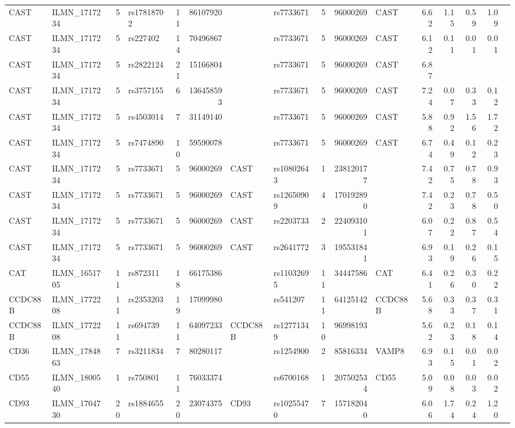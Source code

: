 \documentclass{article}
\begin{document}
\begin{landscape}
{\begin{ThreePartTable}
\begin{longtable}{|llr|lrrl|lrrl|rrrr|r|}
CAST & ILMN\_1717234 & 5 & rs17818702 & 11 & 86107920 &  & rs7733671 & 5 & 96000269 & CAST & 6.62 & 1.15 & 0.59 & 1.09 &  \\
CAST & ILMN\_1717234 & 5 & rs227402 & 14 & 70496867 &  & rs7733671 & 5 & 96000269 & CAST & 6.12 & 0.11 & 0.01 & 0.01 &  \\
CAST & ILMN\_1717234 & 5 & rs2822124 & 21 & 15166804 &  & rs7733671 & 5 & 96000269 & CAST & 6.87 &  &  &  &  \\
CAST & ILMN\_1717234 & 5 & rs3757155 & 6 & 136458593 &  & rs7733671 & 5 & 96000269 & CAST & 7.24 & 0.07 & 0.33 & 0.12 &  \\
CAST & ILMN\_1717234 & 5 & rs4503014 & 7 & 31149140 &  & rs7733671 & 5 & 96000269 & CAST & 5.88 & 0.92 & 1.56 & 1.72 &  \\
CAST & ILMN\_1717234 & 5 & rs7474890 & 10 & 59590078 &  & rs7733671 & 5 & 96000269 & CAST & 6.74 & 0.49 & 0.12 & 0.23 &  \\
CAST & ILMN\_1717234 & 5 & rs7733671 & 5 & 96000269 & CAST & rs10802643 & 1 & 238120177 &  & 7.42 & 0.75 & 0.78 & 0.93 &  \\
CAST & ILMN\_1717234 & 5 & rs7733671 & 5 & 96000269 & CAST & rs12650909 & 4 & 170192890 &  & 7.42 & 0.23 & 0.78 & 0.50 &  \\
CAST & ILMN\_1717234 & 5 & rs7733671 & 5 & 96000269 & CAST & rs2203733 & 2 & 224093101 &  & 6.07 & 0.22 & 0.87 & 0.54 &  \\
CAST & ILMN\_1717234 & 5 & rs7733671 & 5 & 96000269 & CAST & rs2641772 & 3 & 195531841 &  & 6.93 & 0.19 & 0.26 & 0.15 &  \\
CAT & ILMN\_1651705 & 11 & rs872311 & 18 & 66175386 &  & rs11032695 & 11 & 34447586 & CAT & 6.41 & 0.26 & 0.30 & 0.22 &  \\
CCDC88B & ILMN\_1772208 & 11 & rs2353203 & 19 & 17099980 &  & rs541207 & 11 & 64125142 & CCDC88B & 5.68 & 0.33 & 0.37 & 0.31 &  \\
CCDC88B & ILMN\_1772208 & 11 & rs694739 & 11 & 64097233 & CCDC88B & rs12771349 & 10 & 96998193 &  & 5.62 & 0.23 & 0.18 & 0.14 &  \\
CD36 & ILMN\_1784863 & 7 & rs3211834 & 7 & 80280117 &  & rs1254900 & 2 & 85816334 & VAMP8 & 6.93 & 0.15 & 0.01 & 0.02 &  \\
CD55 & ILMN\_1800540 & 1 & rs750801 & 11 & 76033374 &  & rs6700168 & 1 & 207502534 & CD55 & 5.09 & 0.08 & 0.03 & 0.02 &  \\
CD93 & ILMN\_1704730 & 20 & rs1884655 & 20 & 23074375 & CD93 & rs10255470 & 7 & 157182040 &  & 6.06 & 1.74 & 0.24 & 1.20 &  \\

\end{longtable}
\end{ThreePartTable}}
\end{landscape}
\end{document}
